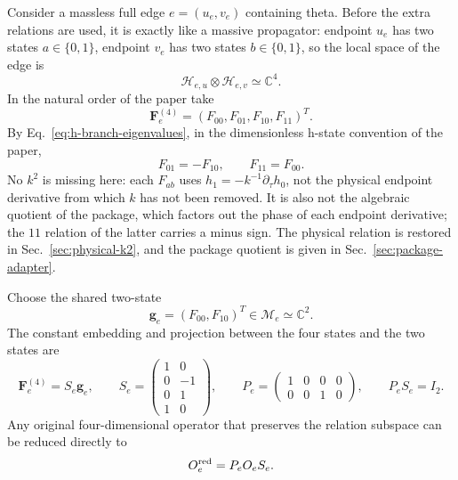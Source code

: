 \documentclass[11pt,a4paper]{article}
\newcommand{\cH}{\mathcal H}
\newcommand{\cM}{\mathcal M}
\begin{document}
Consider a massless full edge $e=(u_e,v_e)$ containing theta. Before the extra relations are used, it is exactly like a massive propagator: endpoint $u_e$ has two states $a\in\{0,1\}$, endpoint $v_e$ has two states $b\in\{0,1\}$, so the local space of the edge is
\begin{equation}
 \cH_{e,u}\otimes\cH_{e,v}\simeq\mathbb C^4.
\end{equation}
In the natural order of the paper take
\begin{equation}
 \bm F_e^{(4)}
 =(F_{00},F_{01},F_{10},F_{11})^T.
\end{equation}
By Eq.~\eqref{eq:h-branch-eigenvalues}, in the dimensionless h-state convention of the paper,
\begin{equation}
 F_{01}=-F_{10},
 \qquad
 F_{11}=F_{00}.
 \label{eq:h-state-massless-relations}
\end{equation}
No $k^2$ is missing here: each $F_{ab}$ uses $h_1=-k^{-1}\partial_\tau h_0$, not the physical endpoint derivative from which $k$ has not been removed. It is also not the algebraic quotient of the package, which factors out the phase of each endpoint derivative; the $11$ relation of the latter carries a minus sign. The physical relation is restored in Sec.~\ref{sec:physical-k2}, and the package quotient is given in Sec.~\ref{sec:package-adapter}.

Choose the shared two-state
\begin{equation}
 \bm g_e=(F_{00},F_{10})^T\in\cM_e\simeq\mathbb C^2.
\end{equation}
The constant embedding and projection between the four states and the two states are
\begin{equation}
 \boxed{
 \bm F_e^{(4)}=S_e\bm g_e,
 \qquad
 S_e=
 \begin{pmatrix}
 1&0\\
 0&-1\\
 0&1\\
 1&0
 \end{pmatrix},
 \qquad
 P_e=
 \begin{pmatrix}
 1&0&0&0\\
 0&0&1&0
 \end{pmatrix},
 \qquad P_eS_e=I_2.
 }
 \label{eq:SP-massless}
\end{equation}
Any original four-dimensional operator that preserves the relation subspace can be reduced directly to
\begin{equation}
 O_e^{\rm red}=P_eO_eS_e.
 \label{eq:POS-reduction}
\end{equation}
\end{document}
